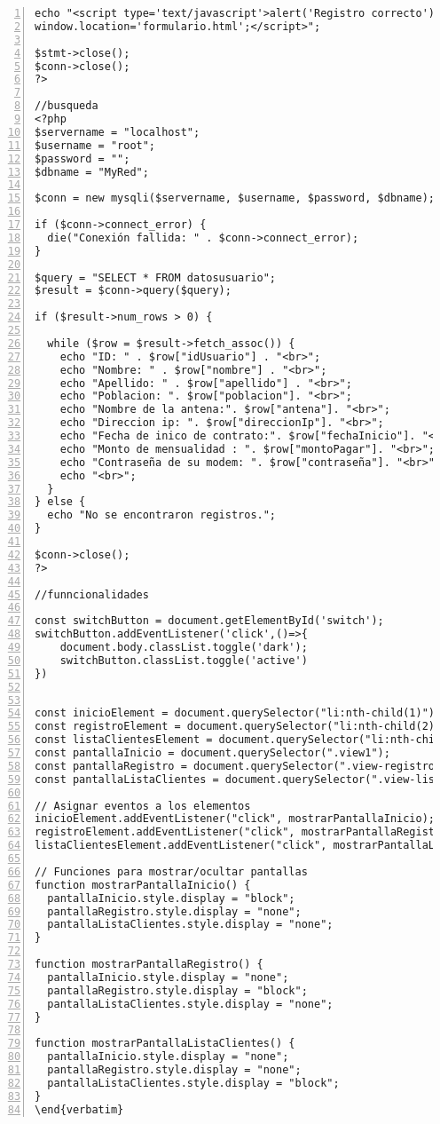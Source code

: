 \begin{lstlisting}[basicstyle=\footnotesize\ttfamily, numbers=left]
echo "<script type='text/javascript'>alert('Registro correcto'); 
window.location='formulario.html';</script>";

$stmt->close();
$conn->close();
?>

//busqueda
<?php
$servername = "localhost";
$username = "root";
$password = "";
$dbname = "MyRed";

$conn = new mysqli($servername, $username, $password, $dbname);

if ($conn->connect_error) {
  die("Conexión fallida: " . $conn->connect_error);
}

$query = "SELECT * FROM datosusuario";
$result = $conn->query($query);

if ($result->num_rows > 0) {
  
  while ($row = $result->fetch_assoc()) {
    echo "ID: " . $row["idUsuario"] . "<br>";
    echo "Nombre: " . $row["nombre"] . "<br>";
    echo "Apellido: " . $row["apellido"] . "<br>";
    echo "Poblacion: ". $row["poblacion"]. "<br>"; 
    echo "Nombre de la antena:". $row["antena"]. "<br>"; 
    echo "Direccion ip: ". $row["direccionIp"]. "<br>";
    echo "Fecha de inico de contrato:". $row["fechaInicio"]. "<br>";
    echo "Monto de mensualidad : ". $row["montoPagar"]. "<br>";
    echo "Contraseña de su modem: ". $row["contraseña"]. "<br>";
    echo "<br>";
  }
} else {
  echo "No se encontraron registros.";
}

$conn->close();
?>

//funncionalidades

const switchButton = document.getElementById('switch');
switchButton.addEventListener('click',()=>{
    document.body.classList.toggle('dark');
    switchButton.classList.toggle('active')
})


const inicioElement = document.querySelector("li:nth-child(1)");
const registroElement = document.querySelector("li:nth-child(2)");
const listaClientesElement = document.querySelector("li:nth-child(3)");
const pantallaInicio = document.querySelector(".view1");
const pantallaRegistro = document.querySelector(".view-registro");
const pantallaListaClientes = document.querySelector(".view-lista-clientes");

// Asignar eventos a los elementos
inicioElement.addEventListener("click", mostrarPantallaInicio);
registroElement.addEventListener("click", mostrarPantallaRegistro);
listaClientesElement.addEventListener("click", mostrarPantallaListaClientes);

// Funciones para mostrar/ocultar pantallas
function mostrarPantallaInicio() {
  pantallaInicio.style.display = "block";
  pantallaRegistro.style.display = "none";
  pantallaListaClientes.style.display = "none";
}

function mostrarPantallaRegistro() {
  pantallaInicio.style.display = "none";
  pantallaRegistro.style.display = "block";
  pantallaListaClientes.style.display = "none";
}

function mostrarPantallaListaClientes() {
  pantallaInicio.style.display = "none";
  pantallaRegistro.style.display = "none";
  pantallaListaClientes.style.display = "block";
}
\end{verbatim}
\end{lstlisting}

